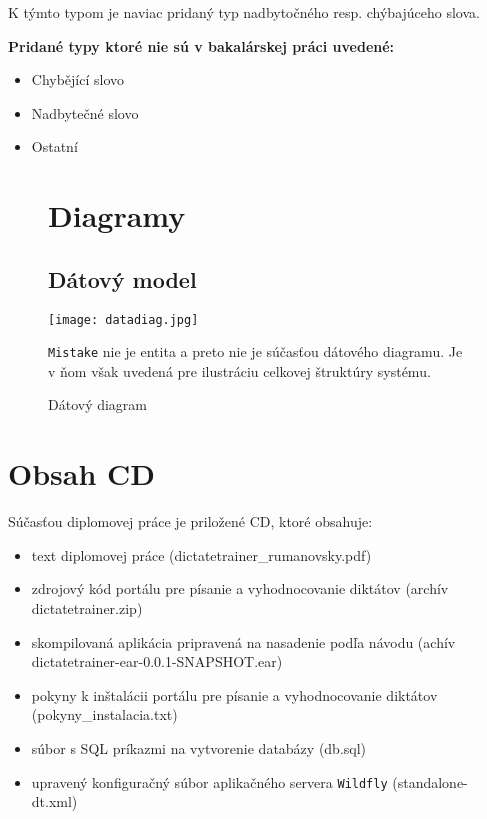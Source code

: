 \documentclass[12pt,oneside]{fithesis2}
\begin{document}
\par K týmto typom je naviac pridaný typ nadbytočného resp. chýbajúceho slova.
\par \bigskip
	\textbf{Pridané typy ktoré nie sú v bakalárskej práci uvedené:}
\begin{itemize}
	\item Chybějící slovo
	\item Nadbytečné slovo
	\item Ostatní
\end{itemize}

	\begin{figure}
\chapter{Diagramy}
	\section{Dátový model} 	\label{datadiag}
	 	\texttt{[image: datadiag.jpg]}
	\caption{Dátový diagram}
	\bigskip
	\texttt{Mistake} nie je entita a preto nie je súčasťou dátového diagramu. Je v ňom však uvedená pre ilustráciu celkovej štruktúry systému.
	\end{figure}

\chapter{Obsah CD}

\par Súčasťou diplomovej práce je priložené CD, ktoré obsahuje:
\begin{itemize}
	\item text diplomovej práce (dictatetrainer\_rumanovsky.pdf)
	\item zdrojový kód portálu pre písanie a vyhodnocovanie diktátov (archív dictatetrainer.zip)
	\item skompilovaná aplikácia pripravená na nasadenie podľa návodu (achív dictatetrainer-ear-0.0.1-SNAPSHOT.ear)
	\item pokyny k inštalácii portálu pre písanie a vyhodnocovanie diktátov (pokyny\_instalacia.txt)
	\item súbor s SQL príkazmi na vytvorenie databázy (db.sql)
	\item upravený konfiguračný súbor aplikačného servera \texttt{Wildfly} (standalone-dt.xml)
\end{itemize}	    
    
\end{document}
